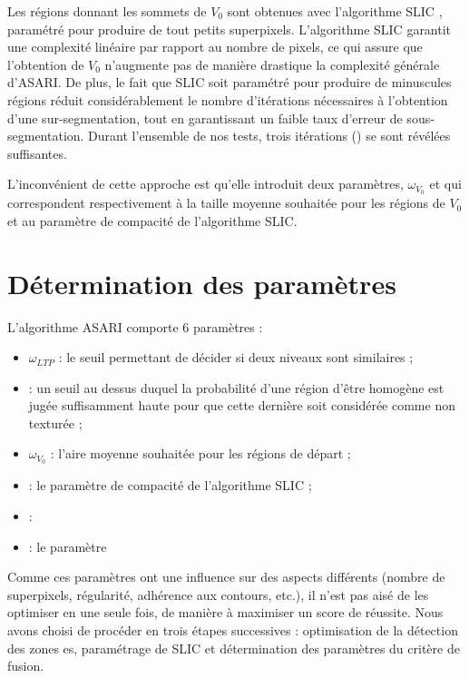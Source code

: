 Les régions donnant les sommets de $V_{0}$ sont obtenues avec l'algorithme SLIC \cite{achanta2012slic}, paramétré pour produire de tout petits superpixels. L'algorithme SLIC garantit une complexité linéaire par rapport au nombre de pixels, ce qui assure que l'obtention de $V_{0}$ n'augmente pas de manière drastique la complexité générale d'ASARI. De plus, le fait que SLIC soit paramétré pour produire de minuscules régions réduit considérablement le nombre d'itérations  nécessaires à l'obtention d'une sur-segmentation, tout en garantissant un faible taux d'erreur de sous-segmentation. Durant l'ensemble de nos tests, trois itérations ()  se sont révélées suffisantes. 

L'inconvénient de cette approche est qu'elle introduit deux paramètres, $\omega_{V_{0}}$ et  qui correspondent respectivement à la taille moyenne souhaitée pour les régions de $V_{0}$ et au paramètre de compacité de l'algorithme SLIC.

\section{Détermination des paramètres}
\label{sec:param}
L'algorithme ASARI comporte $6$ paramètres : 
\begin{itemize}
\item $\omega_{LTP}$ : le seuil permettant de décider si deux niveaux  sont similaires ;
\item {} : un seuil au dessus duquel la probabilité d'une région d'être homogène est jugée suffisamment haute pour que cette dernière soit considérée comme non texturée ;
\item $\omega_{V_{0}}$ : l'aire moyenne souhaitée pour les régions de départ ;
\item {} : le paramètre de compacité de l'algorithme SLIC ;
\item {} : 
\item {} : le paramètre 
\end{itemize}

Comme ces paramètres ont une influence sur des aspects différents (nombre de superpixels, régularité, adhérence aux contours, etc.), il n'est pas aisé de les optimiser en une seule fois, de manière à maximiser un score de réussite. Nous avons choisi de procéder en trois étapes successives : optimisation de la détection des zones es, paramétrage de SLIC et détermination des paramètres du critère de fusion. 

